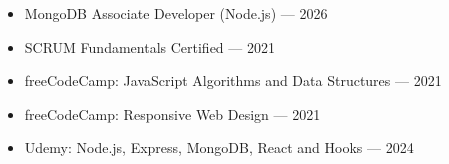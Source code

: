 \documentclass[11pt,a4paper]{article}
\begin{document}
\begin{itemize}

\item MongoDB Associate Developer (Node.js) --- 2026

\item SCRUM Fundamentals Certified --- 2021

\item freeCodeCamp: JavaScript Algorithms and Data Structures --- 2021

\item freeCodeCamp: Responsive Web Design --- 2021

\item Udemy: Node.js, Express, MongoDB, React and Hooks --- 2024

\end{itemize}
\end{document}
